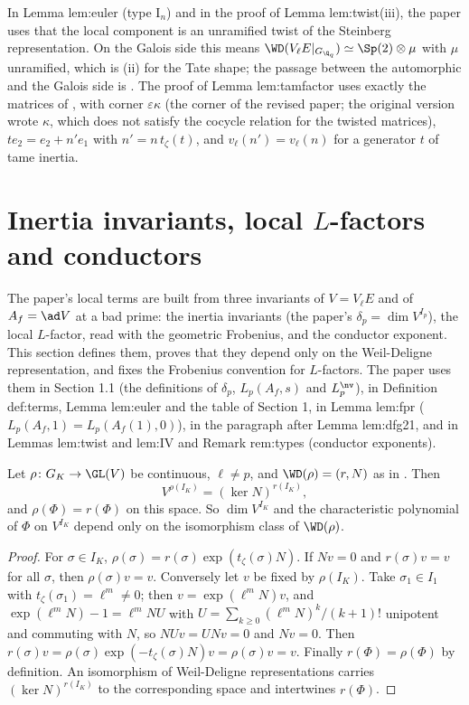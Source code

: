 \begin{paperlink}\label{pl:local:steinberg}
In Lemma lem:euler (type $\mathrm{I}_n$) and in the proof of Lemma lem:twist(iii), the paper uses that the local component is an unramified twist of the Steinberg
representation. On the Galois side this means $\WD(V_\ell E|_{G_{\Q_q}})\simeq\Sp(2)\otimes\mu$ with $\mu$ unramified, which is (ii) for the Tate
shape; the passage between the automorphic and the Galois side is . The proof of Lemma lem:tamfactor uses exactly the matrices of
, with corner $\varepsilon\kappa$ (the corner of the revised paper; the original version wrote $\kappa$, which does not satisfy the cocycle relation for
the twisted matrices), $te_2=e_2+n'e_1$ with
$n'=n\,t_\zeta(t)$, and $v_\ell(n')=v_\ell(n)$ for a generator $t$ of tame inertia.
\end{paperlink}

\section{Inertia invariants, local \texorpdfstring{$L$}{L}-factors and conductors}\label{sec:local:L}

The paper's local terms are built from three invariants of $V=V_\ell E$ and of $A_f=\ad V$ at a bad prime: the inertia invariants (the paper's
$\delta_p=\dim V^{I_p}$), the local $L$-factor, read with the geometric Frobenius, and the conductor exponent. This section defines them, proves that
they depend only on the Weil-Deligne representation, and fixes the Frobenius convention for $L$-factors. The paper uses them in Section 1.1 (the
definitions of $\delta_p$, $L_p(A_f,s)$ and $L^{\nv}_p$), in Definition def:terms, Lemma lem:euler and the table of Section 1, in Lemma lem:fpr
($L_p(A_f,1)=L_p(A_f(1),0)$), in the paragraph after Lemma lem:dfg21, and in Lemmas lem:twist and lem:IV and Remark rem:types (conductor exponents).

\begin{proposition}\label{prop:local:invariants}
Let $\rho\colon G_K\to\GL(V)$ be continuous, $\ell\ne p$, and $\WD(\rho)=(r,N)$ as in . Then
\[
V^{\rho(I_K)}=(\ker N)^{r(I_K)},
\]
and $\rho(\Phi)=r(\Phi)$ on this space. So $\dim V^{I_K}$ and the characteristic polynomial of $\Phi$ on $V^{I_K}$ depend only on the isomorphism class of $\WD(\rho)$.
\end{proposition}

\begin{proof}
For $\sigma\in I_K$, $\rho(\sigma)=r(\sigma)\exp(t_\zeta(\sigma)N)$. If $Nv=0$ and $r(\sigma)v=v$ for all $\sigma$, then $\rho(\sigma)v=v$. Conversely let $v$ be fixed by $\rho(I_K)$. Take
$\sigma_1\in I_1$ with $t_\zeta(\sigma_1)=\ell^m\ne0$; then $v=\exp(\ell^mN)v$, and $\exp(\ell^mN)-1=\ell^mNU$ with $U=\sum_{k\ge0}(\ell^mN)^k/(k+1)!$ unipotent and commuting with $N$, so
$NUv=UNv=0$ and $Nv=0$. Then $r(\sigma)v=\rho(\sigma)\exp(-t_\zeta(\sigma)N)v=\rho(\sigma)v=v$. Finally $r(\Phi)=\rho(\Phi)$ by definition. An isomorphism of Weil-Deligne representations
carries $(\ker N)^{r(I_K)}$ to the corresponding space and intertwines $r(\Phi)$.
\end{proof}

